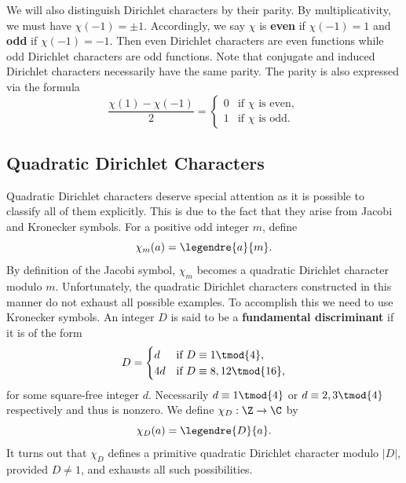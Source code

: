 \documentclass[12pt]{article}
\begin{document}
      We will also distinguish Dirichlet characters by their parity. By multiplicativity, we must have \(\chi(-1) = \pm 1\). Accordingly, we say \(\chi\) is \textbf{even} if \(\chi(-1) = 1\) and \textbf{odd} if \(\chi(-1) = -1\). Then even Dirichlet characters are even functions while odd Dirichlet characters are odd functions. Note that conjugate and induced Dirichlet characters necessarily have the same parity. The parity is also expressed via the formula
      \[
        \frac{\chi(1)-\chi(-1)}{2} = \begin{cases} 0 & \text{if \(\chi\) is even}, \\ 1 & \text{if \(\chi\) is odd}. \end{cases}
      \]
    \subsection{Quadratic Dirichlet Characters}
      Quadratic Dirichlet characters deserve special attention as it is possible to classify all of them explicitly. This is due to the fact that they arise from Jacobi and Kronecker symbols. For a positive odd integer \(m\), define
      \[
        \chi_{m}(a) = \legendre{a}{m}.
      \]
      By definition of the Jacobi symbol, \(\chi_{m}\) becomes a quadratic Dirichlet character modulo \(m\). Unfortunately, the quadratic Dirichlet characters constructed in this manner do not exhaust all possible examples. To accomplish this we need to use Kronecker symbols. An integer \(D\) is said to be a \textbf{fundamental discriminant} if it is of the form
      \[
        D = \begin{cases} d & \text{if \(D \equiv 1 \tmod{4}\)}, \\ 4d & \text{if \(D \equiv 8,12 \tmod{16}\)}, \end{cases}
      \]
      for some square-free integer \(d\). Necessarily \(d \equiv 1 \tmod{4}\) or \(d \equiv 2,3 \tmod{4}\) respectively and thus is nonzero. We define \(\chi_{D}:\Z \to \C\) by
      \[
        \chi_{D}(a) = \legendre{D}{a}.
      \]
      It turns out that \(\chi_{D}\) defines a primitive quadratic Dirichlet character modulo \(|D|\), provided \(D \neq 1\), and exhausts all such possibilities.
\end{document}

